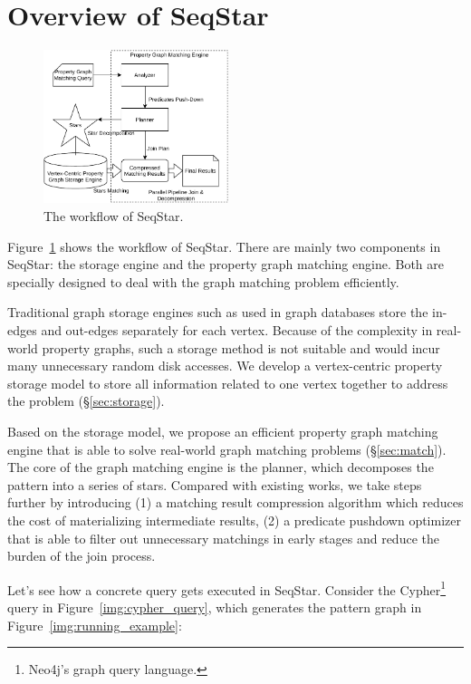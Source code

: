 \section{Overview of SeqStar}\label{sec:framework}
\begin{figure}[ht]
  \centering
  \includegraphics[width=0.48\textwidth]{img/architecture.pdf}
  \caption{The workflow of SeqStar.}\label{img:architecture}
\end{figure}
Figure~\ref{img:architecture} shows the workflow of SeqStar. There are mainly two components in SeqStar: the storage engine and the property graph matching engine.
Both are specially designed to deal with the graph matching problem efficiently.

Traditional graph storage engines such as used in graph databases store the in-edges and out-edges separately for each vertex. 
Because of the complexity in real-world property graphs,
such a storage method is not suitable and would incur many unnecessary random disk accesses.
We develop a vertex-centric property storage model to store all information related to one vertex together to address the problem (\S\ref{sec:storage}).


Based on the storage model,
we propose an efficient property graph matching engine that is able to solve real-world graph matching problems (\S\ref{sec:match}).
The core of the graph matching engine is the planner, which  decomposes the pattern into a series of stars.
Compared with existing works, we take steps further by introducing
(1) a matching result compression algorithm which reduces the cost of materializing intermediate results,
(2) a predicate pushdown optimizer that is able to filter out unnecessary matchings in early stages and reduce the burden of the join process.

Let's see how a concrete query gets executed in SeqStar.
Consider the Cypher\footnote{Neo4j's graph query language.} query in Figure~\ref{img:cypher_query},
which generates the pattern graph in Figure~\ref{img:running_example}:

